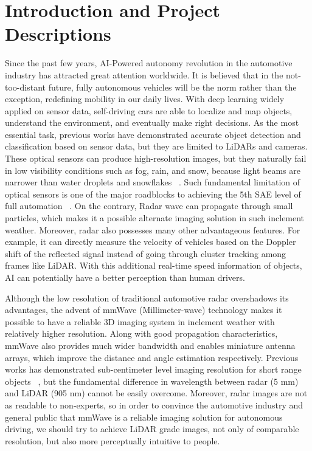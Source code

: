 \section{Introduction and Project Descriptions} \label{introduction}
Since the past few years, AI-Powered autonomy revolution in the automotive industry has attracted great attention worldwide. It is believed that in the not-too-distant future, fully autonomous vehicles will be the norm rather than the exception, redefining mobility in our daily lives. With deep learning widely applied on sensor data, self-driving cars are able to localize and map objects, understand the environment, and eventually make right decisions. As the most essential task, previous works have demonstrated accurate object detection and classification based on sensor data, but they are limited to LiDARs and cameras. These optical sensors can produce high-resolution images, but they naturally fail in low visibility conditions such as fog, rain, and snow, because light beams are narrower than water droplets and snowflakes ~\cite{snow}. Such fundamental limitation of optical sensors is one of the major roadblocks to achieving the 5th SAE level of full automation ~\cite{SAE}. On the contrary, Radar wave can propagate through small particles, which makes it a possible alternate imaging solution in such inclement weather. Moreover, radar also possesses many other advantageous features. For example, it can directly measure the velocity of vehicles based on the Doppler shift of the reflected signal instead of going through cluster tracking among frames like LiDAR. With this additional real-time speed information of objects, AI can potentially have a better perception than human drivers.

Although the low resolution of traditional automotive radar overshadows its advantages, the advent of mmWave (Millimeter-wave)  technology makes it possible to have a reliable 3D imaging system in inclement weather with relatively higher resolution. Along with good propagation characteristics, mmWave also provides much wider bandwidth and enables miniature antenna arrays, which improve the distance and angle estimation respectively. Previous works has demonstrated sub-centimeter level imaging resolution for short range objects ~\cite{mmWave_SAR}, but the fundamental difference in wavelength between radar (5 mm) and LiDAR (905 nm) cannot be easily overcome. Moreover, radar images are not as readable to non-experts, so in order to convince the automotive industry and general public that mmWave is a reliable imaging solution for autonomous driving, we should try to achieve LiDAR grade images, not only of comparable resolution, but also more perceptually intuitive to people. 


